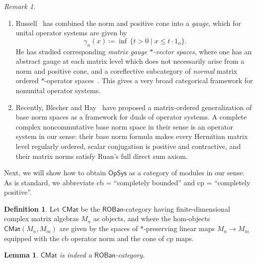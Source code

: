 \documentclass[11pt,onecolumn]{article}
\newcommand{\ROBan}{\mathsf{ROBan}}
\newcommand{\OpSys}{\mathsf{OpSys}}
\theoremstyle{plain}
\newtheorem{lem}[lem]{Lemma}
\theoremstyle{remark}
\newtheorem{remark}[remark]{Remark}
\theoremstyle{definition}
\newtheorem{definition}[definition]{Definition}
\begin{document}
\begin{remark}
\begin{enumerate}[resume]
			More recently, Kennedy, Kim, and Manor~\cite{KennedyKimManorNonunital} have used Werner's notion---reformulated via the canonical inclusion into the partial unitization being completely isometric---and proven a dual equivalence between the category of Werner's operator systems and a certain category of noncommutative convex sets.
		\item Russell~\cite{RussellOrderedSelfAdjoint} has combined the norm and positive cone into a \emph{gauge},
			which for unital operator systems are given by
			\[
				\gamma_n(x) \coloneqq \inf \, \{ t > 0 \mid x \le t \cdot 1_n \}.
			\]
			He has studied corresponding \emph{matrix gauge $*$-vector spaces},
			where one has an abstract gauge at each matrix level which does not necessarily arise from a norm and positive cone,
			and a coreflective subcategory of \emph{normal} matrix ordered $*$-operator spaces~\cite[Theorem~4.2]{RussellOrderedSelfAdjoint}.
			This gives a very broad categorical framework for nonunital operator systems.
			\item Recently, Blecher and Hay~\cite{BlecherHayBaseNormSpaces} have proposed a matrix-ordered generalization of base norm spaces as a framework for duals of operator systems.
				A complete complex noncommutative base norm space in their sense is an operator system in our sense:
				their base norm formula makes every Hermitian matrix level regularly ordered, scalar conjugation is positive and contractive, and their matrix norms satisfy Ruan's full direct sum axiom.
				
		\end{enumerate}
\end{remark}

Next, we will show how to obtain $\OpSys$ as a category of modules in our sense.
As is standard, we abbreviate cb = ``completely bounded'' and cp = ``completely positive''.

\begin{definition}
	Let $\mathsf{CMat}$ be the $\ROBan$-category having finite-dimensional complex matrix algebras $M_n$ as objects, and where the hom-objects $\mathsf{CMat}(M_n, M_m)$ are given by the spaces of $*$-preserving linear maps $M_n \to M_m$ equipped with the cb operator norm and the cone of cp maps.
\end{definition}

\begin{lem}
	$\mathsf{CMat}$ is indeed a $\ROBan$-category.
\end{lem}
\end{document}
